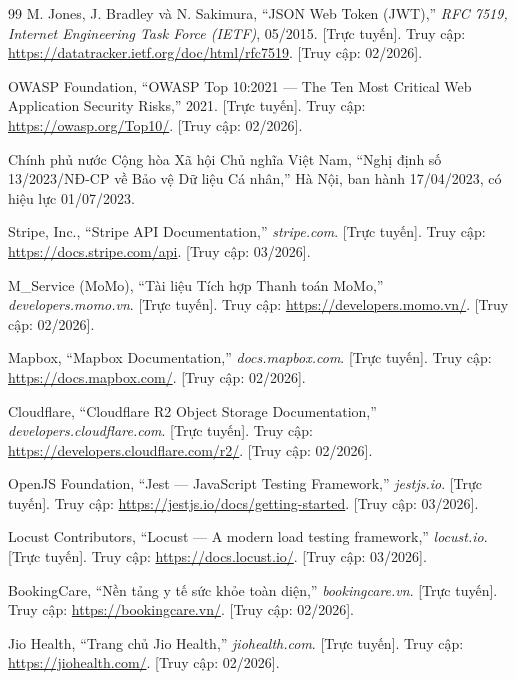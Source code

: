 \begin{thebibliography}{99}
M. Jones, J. Bradley và N. Sakimura, ``JSON Web Token (JWT),'' \textit{RFC 7519, Internet Engineering Task Force (IETF)}, 05/2015. [Trực tuyến]. Truy cập: \url{https://datatracker.ietf.org/doc/html/rfc7519}. [Truy cập: 02/2026].

OWASP Foundation, ``OWASP Top 10:2021 --- The Ten Most Critical Web Application Security Risks,'' 2021. [Trực tuyến]. Truy cập: \url{https://owasp.org/Top10/}. [Truy cập: 02/2026].

Chính phủ nước Cộng hòa Xã hội Chủ nghĩa Việt Nam, ``Nghị định số 13/2023/NĐ-CP về Bảo vệ Dữ liệu Cá nhân,'' Hà Nội, ban hành 17/04/2023, có hiệu lực 01/07/2023.

Stripe, Inc., ``Stripe API Documentation,'' \textit{stripe.com}. [Trực tuyến]. Truy cập: \url{https://docs.stripe.com/api}. [Truy cập: 03/2026].

M\_Service (MoMo), ``Tài liệu Tích hợp Thanh toán MoMo,'' \textit{developers.momo.vn}. [Trực tuyến]. Truy cập: \url{https://developers.momo.vn/}. [Truy cập: 02/2026].

Mapbox, ``Mapbox Documentation,'' \textit{docs.mapbox.com}. [Trực tuyến]. Truy cập: \url{https://docs.mapbox.com/}. [Truy cập: 02/2026].

Cloudflare, ``Cloudflare R2 Object Storage Documentation,'' \textit{developers.cloudflare.com}. [Trực tuyến]. Truy cập: \url{https://developers.cloudflare.com/r2/}. [Truy cập: 02/2026].

OpenJS Foundation, ``Jest --- JavaScript Testing Framework,'' \textit{jestjs.io}. [Trực tuyến]. Truy cập: \url{https://jestjs.io/docs/getting-started}. [Truy cập: 03/2026].

Locust Contributors, ``Locust --- A modern load testing framework,'' \textit{locust.io}. [Trực tuyến]. Truy cập: \url{https://docs.locust.io/}. [Truy cập: 03/2026].

BookingCare, ``Nền tảng y tế sức khỏe toàn diện,'' \textit{bookingcare.vn}. [Trực tuyến]. Truy cập: \url{https://bookingcare.vn/}. [Truy cập: 02/2026].

Jio Health, ``Trang chủ Jio Health,'' \textit{jiohealth.com}. [Trực tuyến]. Truy cập: \url{https://jiohealth.com/}. [Truy cập: 02/2026].

\end{thebibliography}
